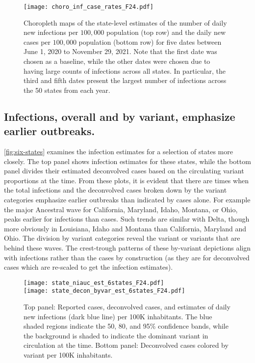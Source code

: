 \begin{figure}[!tb]
\centering
\texttt{[image: choro\_inf\_case\_rates\_F24.pdf]}
\caption{Choropleth maps of the state-level estimates of the number of daily new
infections per $100,000$ population (top row) and the daily new cases per
$100,000$ population (bottom row) for five dates between June 1, 2020 to
November 29, 2021. Note that the first date was chosen as a baseline, while the
other dates were chosen due to having large counts of infections across all
states. In particular, the third and fifth dates present the largest number of
infections across the 50 states from each year.} 
\label{fig:choro_inf_case_rates}
\end{figure}    



    
\subsection{Infections, overall and by variant, emphasize earlier outbreaks.}
\label{sec:infections-by-voc}

\autoref{fig:six-states} examines the infection estimates for a selection of
states more closely.
The top panel shows infection estimates for these states, while the bottom panel
divides their estimated deconvolved cases based on the circulating variant
proportions at the time. From these plots, it is evident that there are times
when the total infections and the deconvolved cases broken down by the variant
categories emphasize earlier outbreaks than indicated by cases alone. For example
the major Ancestral wave for California, Maryland, Idaho, Montana, or Ohio,
peaks earlier for infections than cases. Such trends are similar with Delta,
though more obviously in Louisiana, Idaho and
Montana than California, Maryland and Ohio. The division by variant categories reveal the variant or variants
that are behind these waves. The crest-trough patterns of these by-variant
depictions align with infections rather than the cases by construction (as they
are for deconvolved cases which are re-scaled to get the infection estimates). 


\begin{figure}[!tb]
\centering
    \texttt{[image: state\_niauc\_est\_6states\_F24.pdf]}\\
    \texttt{[image: state\_decon\_byvar\_est\_6states\_F24.pdf]}
    \caption{Top panel: Reported cases, deconvolved cases, and estimates of
    daily new infections (dark blue line) per 100K inhabitants. The blue shaded
    regions indicate the 50, 80, and 95\% confidence bands, while the background
    is shaded to indicate the dominant variant in circulation at the time.  
    Bottom panel: Deconvolved cases colored by variant per 100K inhabitants.}
    \label{fig:six-states}
\end{figure}


